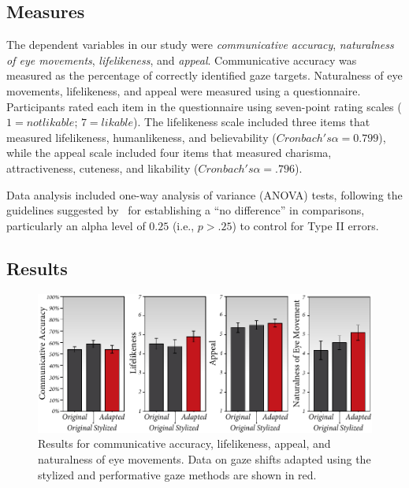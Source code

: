 \subsection{Measures}

The dependent variables in our study were \textit{communicative accuracy}, \textit{naturalness of eye movements}, \textit{lifelikeness}, and \textit{appeal}. Communicative accuracy was measured as the percentage of correctly identified gaze targets. Naturalness of eye movements, lifelikeness, and appeal were measured using a questionnaire. Participants rated each item in the questionnaire using seven-point rating scales ($1 = not likable$; $7 = likable$). The lifelikeness scale included three items that measured lifelikeness, humanlikeness, and believability ($Cronbach's \alpha = 0.799$), while the appeal scale included four items that measured charisma, attractiveness, cuteness, and likability ($Cronbach's \alpha = .796$).

Data analysis included one-way analysis of variance (ANOVA) tests, following the guidelines suggested by~\citet{julnes1989analysis} for establishing a ``no difference'' in comparisons, particularly an alpha level of $0.25$ (i.e., $p > .25$) to control for Type II errors.

\subsection{Results}

\begin{figure}
\centering
\includegraphics[width=1\textwidth]{stylizedgaze/Figures/Results.pdf}
\caption{Results for communicative accuracy, lifelikeness, appeal, and naturalness of eye movements. Data on gaze shifts adapted using the stylized and performative gaze methods are shown in red.}
\label{fig:StudyResults}
\end{figure}

